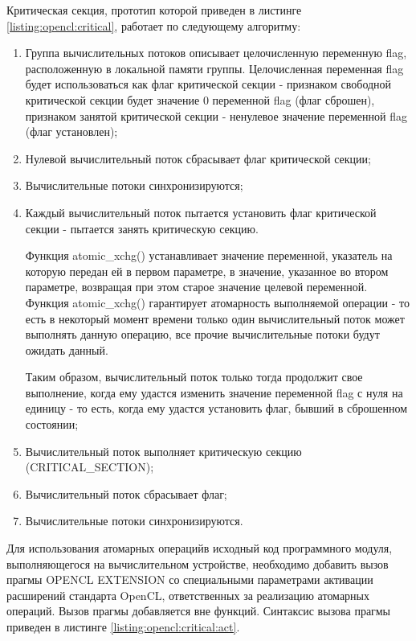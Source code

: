 	Критическая секция, прототип которой приведен в листинге \ref{listing:opencl:critical}, работает по следующему алгоритму:

	\begin{enumerate}

		\item Группа вычислительных потоков описывает целочисленную переменную flag, расположенную в локальной памяти группы. Целочисленная переменная flag будет использоваться как флаг критической секции - признаком свободной критической секции будет значение 0 переменной flag (флаг сброшен), признаком занятой критической секции - ненулевое значение переменной flag (флаг установлен);
		\item Нулевой вычислительный поток сбрасывает флаг критической секции;
		\item Вычислительные потоки синхронизируются;
		\item Каждый вычислительный поток пытается установить флаг критической секции - пытается занять критическую секцию.

			Функция atomic\_xchg() устанавливает значение переменной, указатель на которую передан ей в первом параметре, в значение, указанное во втором параметре, возвращая при этом старое значение целевой переменной. Функция atomic\_xchg() гарантирует атомарность выполняемой операции - то есть в некоторый момент времени только один вычислительный поток может выполнять данную операцию, все прочие вычислительные потоки будут ожидать данный.

			Таким образом, вычислительный поток только тогда продолжит свое выполнение, когда ему удастся изменить значение переменной flag с нуля на единицу - то есть, когда ему удастся установить флаг, бывший в сброшенном состоянии;

		\item Вычислительный поток выполняет критическую секцию (CRITICAL\_SECTION);
		\item Вычислительный поток сбрасывает флаг;
		\item Вычислительные потоки синхронизируются.

	\end{enumerate}

	Для использования атомарных операцийв исходный код программного модуля, выполняющегося на вычислительном устройстве, необходимо добавить вызов прагмы OPENCL EXTENSION со специальными параметрами активации расширений стандарта OpenCL, ответственных за реализацию атомарных операций. Вызов прагмы добавляется вне функций. Синтаксис вызова прагмы приведен в листинге \ref{listing:opencl:critical:act}.

